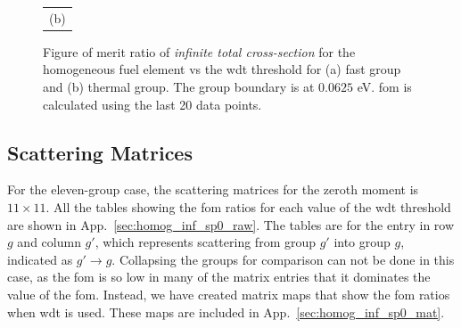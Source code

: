\begin{figure}[hbtp]
\begin{tabular}{c}
    (b) 
  \end{tabular}
  \caption[Figure of merit ratio of the  \textit{infinite total cross-section} for the
  homogeneous fuel element]{Figure of merit ratio of
     \textit{infinite total cross-section} for the homogeneous fuel element vs the \gls{wdt}
    threshold for (a) fast group and (b) thermal group. The group
    boundary is at $0.0625$ eV. \gls{fom} is calculated using the last
    20 data points.}
  \label{fig:homog_inf_tot}
\end{figure}

\subsection{Scattering Matrices}
\label{sec:homog_inf_sp0}

For the eleven-group case, the scattering matrices for the zeroth
moment is $11 \times 11$. All the tables showing the \gls{fom}
ratios for each value of the \gls{wdt} threshold are shown in
App.~\ref{sec:homog_inf_sp0_raw}. The tables are for the entry in row $g$
and column $g'$, which represents scattering from group $g'$ into
group $g$, indicated as $g' \to g$. Collapsing the groups for
comparison can not be done in this case, as the \gls{fom} is so low in
many of the matrix entries that it dominates the value of the
\gls{fom}. Instead, we have created matrix maps that show the
\gls{fom} ratios when \gls{wdt} is used. These maps are included in
App.~\ref{sec:homog_inf_sp0_mat}. 


